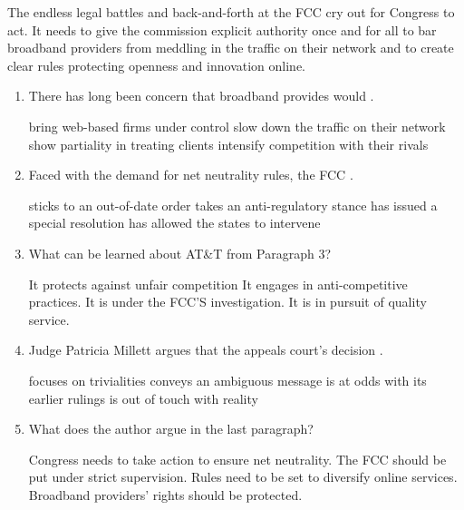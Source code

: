 The endless legal battles and back-and-forth at the FCC cry out for
Congress to act. It needs to give the commission explicit authority once
and for all to bar broadband providers from meddling in the traffic on
their network and to create clear rules protecting openness and
innovation online.

\begin{enumerate}[resume]
	\item
There has long been concern that broadband provides would \lineread.


\fourchoices
{bring web-based firms under control}
{slow down the traffic on their network}
{show partiality in treating clients}
{intensify competition with their rivals}


\item
Faced with the demand for net neutrality rules, the FCC \lineread.


\fourchoices
{sticks to an out-of-date order}
{takes an anti-regulatory stance}
{has issued a special resolution}
{has allowed the states to intervene}



\item
What can be learned about AT\&T from Paragraph 3?


\fourchoices
{It protects against unfair competition}
{It engages in anti-competitive practices.}
{It is under the FCC'S investigation.}
{It is in pursuit of quality service.}


\item
Judge Patricia Millett argues that the appeals court's decision \lineread.


\fourchoices
{focuses on trivialities}
{conveys an ambiguous message}
{is at odds with its earlier rulings}
{is out of touch with reality}


\item
What does the author argue in the last paragraph?


\fourchoices
{Congress needs to take action to ensure net neutrality.}
{The FCC should be put under strict supervision.}
{Rules need to be set to diversify online services.}
{Broadband providers' rights should be protected.}
	
	
	
\end{enumerate}




